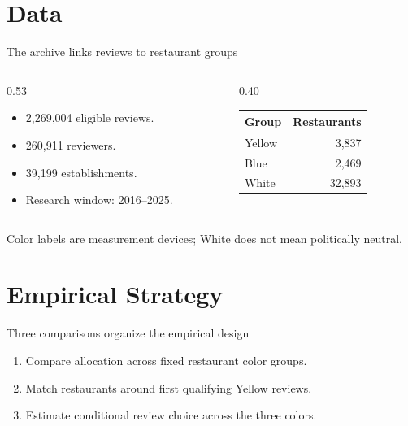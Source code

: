 \documentclass[aspectratio=169,11pt]{beamer}
\begin{document}
\section{Data}
\begin{frame}{The archive links reviews to restaurant groups}
\begin{columns}[T,onlytextwidth]
\begin{column}{0.53\textwidth}
\begin{itemize}\setlength{\itemsep}{0.45cm}
  \item 2,269,004 eligible reviews.
  \item 260,911 reviewers.
  \item 39,199 establishments.
  \item Research window: 2016--2025.
\end{itemize}
\end{column}
\begin{column}{0.40\textwidth}
\centering\renewcommand{\arraystretch}{1.35}
\begin{tabular}{lr}\toprule
Group & Restaurants \\\midrule
Yellow & 3,837 \\
Blue & 2,469 \\
White & 32,893 \\\bottomrule
\end{tabular}
\end{column}
\end{columns}
\vspace{0.65cm}
\begin{PMtakeaway}
Color labels are measurement devices; White does not mean politically neutral.
\end{PMtakeaway}
\end{frame}

\section{Empirical Strategy}
\begin{frame}{Three comparisons organize the empirical design}
\begin{enumerate}\setlength{\itemsep}{1cm}
  \item Compare allocation across fixed restaurant color groups.
  \item Match restaurants around first qualifying Yellow reviews.
  \item Estimate conditional review choice across the three colors.
\end{enumerate}
\vspace{0.7cm}
\end{frame}
\end{document}
